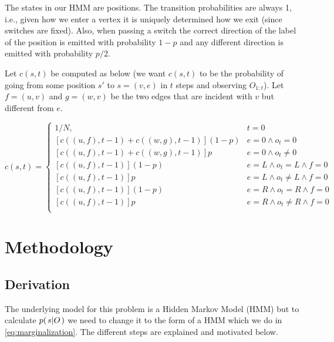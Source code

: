 \documentclass[a4paper,11pt]{kth-mag}
\begin{document}
    The states in our HMM are positions. The transition probabilities are
    always 1, i.e., given how we enter a vertex it is uniquely determined how
    we exit (since switches are fixed). Also, when passing a switch the correct
    direction of the label of the position is emitted with probability $1-p$
    and any different direction is emitted with probability $p/2$.

    Let $c(s,t)$ be computed as below (we want $c(s,t)$ to be the probability
    of going from some position $s'$ to $s=(v,e)$ in $t$ steps and observing
    $O_{1:t}$). Let $f=(u,v)$ and $g=(w,v)$ be the two edges that are incident
    with $v$ but different from $e$.

    \begin{equation}
        c(s,t) =
        \begin{cases}
            1/N, & t = 0 \\
            \left[c((u,f),t-1) + c((w,g),t-1)\right](1-p) & e = 0 \wedge o_t = 0 \\
            \left[c((u,f),t-1) + c((w,g),t-1)\right]p     & e = 0 \wedge o_t \neq 0 \\
            \left[c((u,f),t-1)               \right](1-p) & e = L \wedge o_t = L \wedge f = 0 \\
            \left[c((u,f),t-1)               \right]p     & e = L \wedge o_t \neq L \wedge f = 0 \\
            \left[c((u,f),t-1)               \right](1-p) & e = R \wedge o_t = R \wedge f = 0 \\
            \left[c((u,f),t-1)               \right]p     & e = R \wedge o_t \neq R \wedge f = 0 \\
        \end{cases}
    \end{equation}

    \chapter{Methodology}
        \section{Derivation}
        The underlying model for this problem is a Hidden Markov Model (HMM) 
        but to calculate $p{(\left. s \middle\vert O \right.)}$ we need to change it to the form of 
        a HMM which we do in \eqref{eq:marginalization}. 
        The different steps are explained and motivated below.
\end{document}
